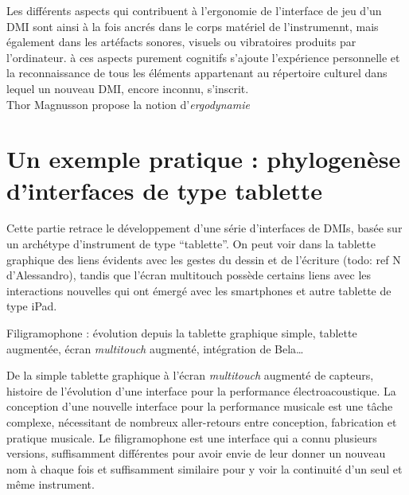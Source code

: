 \noindent Les différents aspects qui contribuent à l'ergonomie de l'interface de jeu d'un \gls{DMI} sont ainsi à la fois ancrés dans le corps matériel de l'instrumennt, mais également dans les artéfacts sonores, visuels ou vibratoires produits par l'ordinateur. à ces aspects purement cognitifs s'ajoute l'expérience personnelle et la reconnaissance de tous les éléments appartenant au répertoire culturel dans lequel un nouveau \gls{DMI}, encore inconnu, s'inscrit.\\
\indent Thor Magnusson propose la notion d'\textit{ergodynamie} 


\section{Un exemple pratique : phylogenèse d'interfaces de type tablette}
\label{sec:interfaces:phylogenese}

\noindent Cette partie retrace le développement d'une série d'interfaces de \glspl{DMI}, basée sur un archétype d'instrument de type ``tablette''. On peut voir dans la tablette graphique des liens évidents avec les gestes du dessin et de l'écriture (todo: ref N d'Alessandro), tandis que l'écran multitouch possède certains liens avec les interactions nouvelles qui ont émergé avec les smartphones et autre tablette de type iPad.

Filigramophone : évolution depuis la tablette graphique simple, tablette augmentée, écran \textit{multitouch} augmenté, intégration de Bela…

De la simple tablette graphique à l’écran \textit{multitouch} augmenté de capteurs, histoire de l’évolution d’une interface pour la performance électroacoustique.
La conception d’une nouvelle interface pour la performance musicale est une tâche complexe, nécessitant de nombreux aller-retours entre conception, fabrication et pratique musicale. Le filigramophone est une interface qui a connu plusieurs versions, suffisamment différentes pour avoir envie de leur donner un nouveau nom à chaque fois et suffisamment similaire pour y voir la continuité d’un seul et même instrument.

